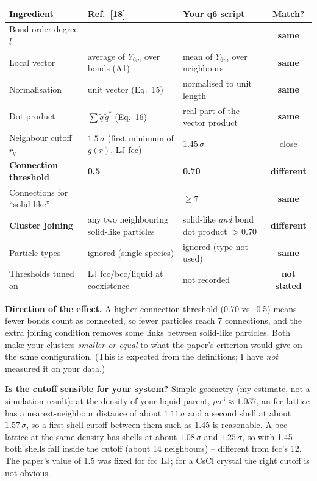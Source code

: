 \documentclass[10.5pt,a4paper]{article}
\newcommand{\same}{\textcolor{green!45!black}{\textbf{same}}}
\newcommand{\diff}{\textcolor{red!70!black}{\textbf{different}}}
\newcommand{\unk}{\textcolor{warnline}{\textbf{not stated}}}
\begin{document}
\small
\begin{longtable}{@{}>{\raggedright\arraybackslash}p{3.3cm} >{\raggedright\arraybackslash}p{3.7cm} >{\raggedright\arraybackslash}p{4.4cm} c@{}}
\toprule
\textbf{Ingredient} & \textbf{Ref.\ [18]} & \textbf{Your q6 script} & \textbf{Match?}\\
\midrule
\endhead
Bond-order degree $l$ & 6 & 6 & \same\\
Local vector & average of $Y_{6m}$ over bonds (A1) & mean of $Y_{6m}$ over neighbours & \same\\
Normalisation & unit vector (Eq.~15) & normalised to unit length & \same\\
Dot product & $\sum\tilde q\,\tilde q^{*}$ (Eq.~16) & real part of the vector product & \same\\
Neighbour cutoff $r_q$ & $1.5\,\sigma$ (first minimum of $g(r)$, LJ fcc) & $1.45\,\sigma$ & close\\
\textbf{Connection threshold} & \textbf{0.5} & \textbf{0.70} & \diff\\
Connections for ``solid-like'' & 7 & $\ge7$ & \same\\
\textbf{Cluster joining} & any two neighbouring solid-like particles & solid-like \emph{and} bond dot product $>0.70$ & \diff\\
Particle types & ignored (single species) & ignored (type not used) & \same\\
Thresholds tuned on & LJ fcc/bcc/liquid at coexistence & not recorded & \unk\\
\bottomrule
\end{longtable}
\normalsize

\textbf{Direction of the effect.} A higher connection threshold (0.70 vs.\ 0.5) means fewer bonds count as connected, so fewer particles reach 7 connections, and the extra joining condition removes some links between solid-like particles. Both make your clusters \emph{smaller or equal} to what the paper's criterion would give on the same configuration. (This is expected from the definitions; I have \emph{not} measured it on your data.)

\textbf{Is the cutoff sensible for your system?} Simple geometry (my estimate, not a simulation result): at the density of your liquid parent, $\rho\sigma^{3}\approx1.037$, an fcc lattice has a nearest-neighbour distance of about $1.11\,\sigma$ and a second shell at about $1.57\,\sigma$, so a first-shell cutoff between them such as 1.45 is reasonable. A bcc lattice at the same density has shells at about $1.08\,\sigma$ and $1.25\,\sigma$, so with 1.45 both shells fall inside the cutoff (about 14 neighbours) -- different from fcc's 12. The paper's value of 1.5 was fixed for fcc LJ; for a CsCl crystal the right cutoff is not obvious.
\end{document}
